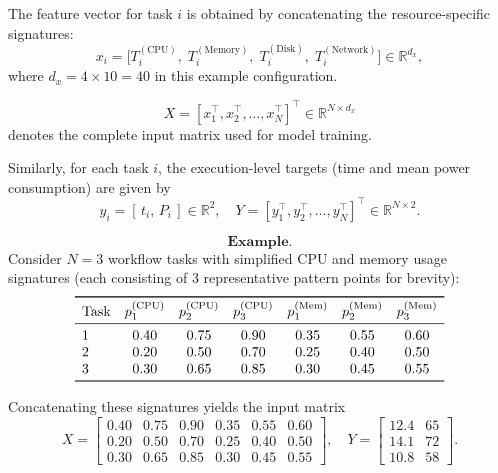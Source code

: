 \noindent
The feature vector for task \( i \) is obtained by concatenating
the resource-specific signatures:
\[
    x_i =
    \bigl[
    T_i^{(\text{CPU})},\;
    T_i^{(\text{Memory})},\;
    T_i^{(\text{Disk})},\;
    T_i^{(\text{Network})}
    \bigr]
    \in \mathbb{R}^{d_x},
\]
where \( d_x = 4 \times 10 = 40 \) in this example configuration.

\[
    X =
    [x_1^\top, x_2^\top, \dots, x_N^\top]^\top
    \in \mathbb{R}^{N \times d_x}
\]
denotes the complete input matrix used for model training.

Similarly, for each task \( i \), the execution-level targets
(time and mean power consumption) are given by
\[
    y_i = [\,t_i,\, P_i\,] \in \mathbb{R}^2,
    \quad
    Y = [y_1^\top, y_2^\top, \dots, y_N^\top]^\top
    \in \mathbb{R}^{N \times 2}.
\]

\[
    \textbf{Example.}
\]
Consider \( N = 3 \) workflow tasks with simplified
CPU and memory usage signatures
(each consisting of 3 representative pattern points for brevity):
\[
    \begin{array}{lcccccc}
        \toprule
        \text{Task}        &
        p_1^{(\text{CPU})} & p_2^{(\text{CPU})} & p_3^{(\text{CPU})} &
        p_1^{(\text{Mem})} & p_2^{(\text{Mem})} & p_3^{(\text{Mem})}                             \\
        \midrule
        1                  & 0.40               & 0.75               & 0.90 & 0.35 & 0.55 & 0.60 \\
        2                  & 0.20               & 0.50               & 0.70 & 0.25 & 0.40 & 0.50 \\
        3                  & 0.30               & 0.65               & 0.85 & 0.30 & 0.45 & 0.55 \\
        \bottomrule
    \end{array}
\]

Concatenating these signatures yields the input matrix
\[
    X =
    \begin{bmatrix}
        0.40 & 0.75 & 0.90 & 0.35 & 0.55 & 0.60 \\
        0.20 & 0.50 & 0.70 & 0.25 & 0.40 & 0.50 \\
        0.30 & 0.65 & 0.85 & 0.30 & 0.45 & 0.55
    \end{bmatrix},
    \quad
    Y =
    \begin{bmatrix}
        12.4 & 65 \\
        14.1 & 72 \\
        10.8 & 58
    \end{bmatrix}.
\]

